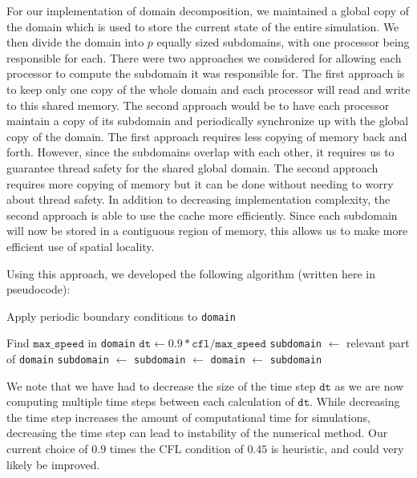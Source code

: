 \documentclass[11pt]{article}
\newcommand{\ttt}{\texttt}
\begin{document}
For our implementation of domain decomposition, we maintained a global copy of the domain which is used to store the current state of the entire simulation. We then divide the domain into $p$ equally sized subdomains, with one processor being responsible for each. There were two approaches we considered for allowing each processor to compute the subdomain it was responsible for. The first approach is to keep only one copy of the whole domain and each processor will read and write to this shared memory. The second approach would be to have each processor maintain a copy of its subdomain and periodically synchronize up with the global copy of the domain. The first approach requires less copying of memory back and forth. However, since the subdomains overlap with each other, it requires us to guarantee thread safety for the shared global domain. The second approach requires more copying of memory but it can be done without needing to worry about thread safety. In addition to decreasing implementation complexity, the second approach is able to use the cache more efficiently. Since each subdomain will now be stored in a contiguous region of memory, this allows us to make more efficient use of spatial locality. 

Using this approach, we developed the following algorithm (written here in pseudocode):

\begin{algorithm}
\begin{algorithmic}[1]
\item Apply periodic boundary conditions to \ttt{domain}
\item Find $\ttt{max\_speed}$ in \ttt{domain}
\State $\ttt{dt} \gets 0.9*\ttt{cfl} / \ttt{max\_speed}$
	\State \ttt{subdomain} $\gets$ relevant part of \ttt{domain}
		\State \ttt{subdomain} $\gets$  
		\State \ttt{subdomain} $\gets$ 
	\EndFor
	\State \ttt{domain} $\gets$ \ttt{subdomain}
\EndFor
\end{algorithmic}
\end{algorithm}

We note that we have had to decrease the size of the time step $\ttt{dt}$ as we are now computing multiple time steps between each calculation of $\ttt{dt}$. While decreasing the time step increases the amount of computational time for simulations, decreasing the time step can lead to instability of the numerical method. Our current choice of $0.9$ times the CFL condition of $0.45$ is heuristic, and could very likely be improved.
\end{document}

